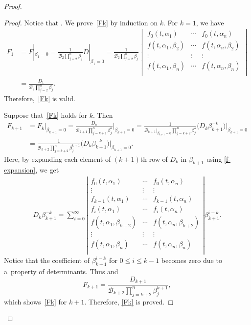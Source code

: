 \documentclass[10pt,a4paper]{amsart}
\numberwithin{equation}{section}
\theoremstyle{definition}
\begin{document}
\begin{proof}
\begin{proof}
Notice that
.
We prove~\eqref{Fk} by induction on $k$.
For $k=1$, we have
\begin{align*}
F_1
&=
F|_{\beta_1=0}
=
\frac{1}{{\mathcal B}_{2}\prod_{j=2}^n\beta_j}D|_{\beta_1=0}=
\frac{1}{{\mathcal B}_{2}\prod_{j=2}^n\beta_j}
\begin{vmatrix}
f_0(t,\alpha_1)&\cdots&f_0(t,\alpha_n)\\
f(t,\alpha_1,\beta_2)&\cdots&f(t,\alpha_n,\beta_2)\\
\vdots&\vdots&\vdots\\
f(t,\alpha_1,\beta_n)&\cdots&f(t,\alpha_n,\beta_n)\\
\end{vmatrix}
\\
&=
\frac{D_1}{{\mathcal B}_{2}\prod_{j=2}^n\beta_j}.
\end{align*}
Therefore,~\eqref{Fk} is valid.

{\samepage
Suppose that~\eqref{Fk} holds for $k$. Then
\begin{align*}
F_{k+1}
&=
F_k|_{\beta_{k+1}=0}
=
\frac{D_k}{{\mathcal B}_{k+1}\prod_{j=k+1}^n \beta_j^k}\Big|_{\beta_{k+1}=0}
=
\frac{1}{{\mathcal B}_{k+1}|_{\beta_{k+1}=0}\prod_{j=k+2}^n \beta_j^k}\bigl(D_k\beta_{k+1}^{-k}\bigr)\Big|_{\beta_{k+1}=0}
\\
&=
\frac{1}{{\mathcal B}_{k+2}\prod_{j=k+2}^n \beta_j^{k+1}}
\bigl(D_k\beta_{k+1}^{-k}\bigr)\Big|_{\beta_{k+1}=0}.
\end{align*}}
Here, by expanding each element of $(k+1)$th row of $D_k$ in $\beta_{k+1}$ using
\eqref{f-expansion}, we get
\begin{gather*}
D_k\beta_{k+1}^{-k}
=
\sum_{i=0}^\infty
\left|
\begin{matrix}
f_0(t,\alpha_1)&\cdots&f_0(t,\alpha_n)\\
\vdots&\vdots&\vdots\\
f_{k-1}(t,\alpha_1)&\cdots&f_{k-1}(t,\alpha_n)\\
f_{i}(t,\alpha_1)&\cdots&f_{i}(t,\alpha_n)\\
f(t,\alpha_1,\beta_{k+2})&\cdots&f(t,\alpha_n,\beta_{k+2})\\
\vdots&\vdots&\vdots\\
f(t,\alpha_1,\beta_{n})&\cdots&f(t,\alpha_n,\beta_{n})\\
\end{matrix}
\right|\beta_{k+1}^{i-k}.
\end{gather*}
Notice that the coefficient of $\beta_{k+1}^{i-k}$ for $0\leq i\leq k-1$ becomes zero
due to a~property of determinants.
Thus
and
\[
 F_{k+1}=
\frac{D_{k+1}}{{\mathcal B}_{k+2}\prod_{j=k+2}^n\beta_j^{k+1}},
\]
which shows~\eqref{Fk} for $k+1$. Therefore, \eqref{Fk} is proved.
\end{proof}


\end{proof}
\end{document}
